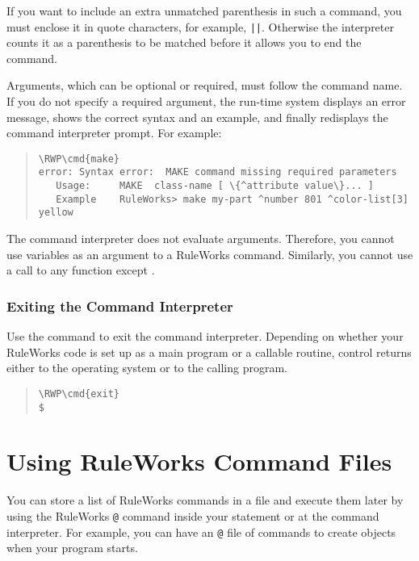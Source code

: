 If you want to include an extra unmatched parenthesis in such a
command, you must enclose it in quote characters, for example,
\verb,||,. Otherwise the interpreter counts it as a parenthesis to be
matched before it allows you to end the command.

Arguments, which can be optional or required, must follow the
command name. If you do not specify a required argument, the
run-time system displays an error message, shows the correct
syntax and an example, and finally redisplays the command
interpreter prompt. For example:

\begin{quote}
\begin{Verbatim}[commandchars=\\\{\}]
\RWP\cmd{make}
error: Syntax error:  MAKE command missing required parameters
   Usage:     MAKE  class-name [ \{^attribute value\}... ]
   Example    RuleWorks> make my-part ^number 801 ^color-list[3] yellow
\end{Verbatim}
\end{quote}

\begin{note}
  The command interpreter does not evaluate arguments.  Therefore, you
  cannot use variables as an argument to a RuleWorks
  command. Similarly, you cannot use a call to any function except
  .
\end{note}

\subsubsection{Exiting the Command Interpreter}

Use the  command to exit the command interpreter. Depending
on whether your RuleWorks code is set up as a main program or a
callable routine, control returns either to the operating system or to
the calling program.

\begin{quote}
\begin{Verbatim}[commandchars=\\\{\}]
\RWP\cmd{exit}
$
\end{Verbatim}
\end{quote}

\section{Using RuleWorks Command Files}

You can store a list of RuleWorks commands in a file and execute them
later by using the RuleWorks \verb|@| command inside your
 statement or at the command interpreter. For example,
you can have an \verb|@| file of  commands to create objects
when your program starts.

